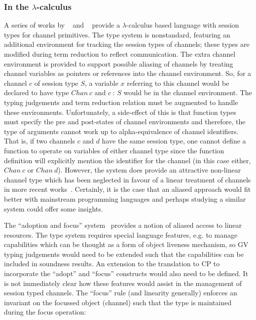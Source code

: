 \documentclass{mpaper}
\begin{document}
\subsubsection{In the \texorpdfstring{$\lambda$}{lambda}-calculus}
\label{sec:lam}

A series of works by \citeauthor{Gay:2003:STI}~\cite{Gay:2003:STI} and
\citeauthor{Vasconcelos:2006:TCM}~\cite{Vasconcelos:2006:TCM} provide a
$\lambda$-calculus based language with session types for channel
primitives. The type system is nonstandard, featuring an additional
environment for tracking the session types of channels; these types are
modified during term reduction to reflect communication. The extra channel
environment is provided to support possible aliasing of channels by treating
channel variables as pointers or references into the channel environment. So,
for a channel $c$ of session type $S$, a variable $x$ referring to this
channel would be declared to have type $Chan~c$ and $c~:~S$ would be in the
channel environment. The typing judgements and term reduction relation must be
augmented to handle these environments. Unfortunately, a side-effect of this
is that function types must specify the pre and post-states of channel
environments and therefore, the type of arguments cannot work up to
alpha-equivalence of channel identifiers. That is, if two channels $c$ and $d$
have the same session type, one cannot define a function to operate on
variables of either channel type since the function definition will explicitly
mention the identifier for the channel (in this case either, $Chan~c$ or
$Chan~d$). However, the system does provide an attractive non-linear channel
type which has been neglected in favour of a linear treatment of channels in
more recent
works~\cite{Gay:2010:LAST,Mazurak:2010:LCC,Wadler:2014}. Certainly, it is the
case that an aliased approach would fit better with mainstream programming
languages and perhaps studying a similar system could offer some insights.

The ``adoption and focus'' system~\cite{Fahndrich:2002} provides a notion of
aliased access to linear resources. The type system requires special language
features, e.g. to manage capabilities which can be thought as a form of object
liveness mechanism, so GV typing judgements would need to be extended such
that the capabilities can be included in soundness results. An extension to
the translation to CP to incorporate the ``adopt'' and ``focus'' constructs
would also need to be defined. It is not immediately clear how these features
would assist in the management of session typed channels. The ``focus'' rule
(and linearity generally) enforces an invariant on the focussed object
(channel) such that the type is maintained during the focus operation:

\end{document}
